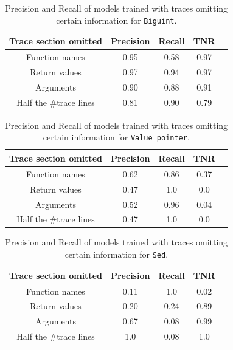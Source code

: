 \begin{table}[]
\centering
\begin{tabular}{|c|c|c|c|c|}
	\hline
	Trace section omitted   & {Precision} & {Recall} & TNR\\ 
	\hline \hline
	Function names  & 0.95 & 0.58 & 0.97 \\ \hline 
	Return values & 0.97  & 0.94 & 0.97 \\ \hline
	Arguments & 0.90  & 0.88 & 0.91 \\ \hline
	Half the \#trace lines & 0.81 & 0.90 & 0.79 \\ \hline 
\end{tabular}
\caption{Precision and Recall of models trained with traces omitting certain information for \texttt{Biguint}. }
\label{tab:biguint_removed_trace}
\end{table}

\begin{table}[]
\centering
\begin{tabular}{|c|c|c|c|c|}
	\hline
	Trace section omitted   & {Precision} & {Recall} & TNR\\ 
	\hline \hline
	Function names  & 0.62 & 0.86 & 0.37 \\ \hline 
	Return values & 0.47  & 1.0 & 0.0 \\ \hline
	Arguments & 0.52  & 0.96 & 0.04 \\ \hline
	Half the \#trace lines & 0.47 & 1.0 & 0.0 \\ \hline 
\end{tabular}
\caption{Precision and Recall of models trained with traces omitting certain information for \texttt{Value pointer}. }
\label{tab:valueptr_removed_trace}
\end{table}



\begin{table}[]
\centering
\begin{tabular}{|c|c|c|c|c|}
	\hline
	Trace section omitted   & {Precision} & {Recall} & TNR\\ 
	\hline \hline
	Function names  & 0.11 & 1.0 & 0.02 \\ \hline 
	Return values & 0.20  & 0.24 & 0.89 \\ \hline
	Arguments & 0.67  & 0.08 & 0.99 \\ \hline
	Half the \#trace lines & 1.0 & 0.08 & 1.0 \\ \hline 
\end{tabular}
\caption{Precision and Recall of models trained with traces omitting certain information for \texttt{Sed}. }
\label{tab:sed_removed_trace}
\end{table}


